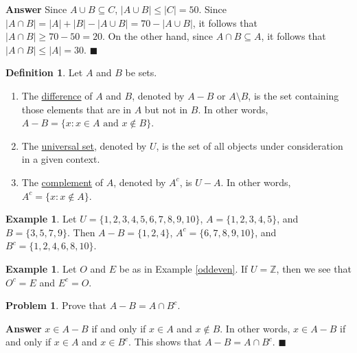 \documentclass[12pt,letterpaper]{book}
\numberwithin{equation}{section}
\theoremstyle{definition}
\newtheorem{defi}[thm]{\textbf{Definition}}
\newtheorem{problem}[thm]{\textbf{Problem}}
\newtheorem{example}[thm]{\textbf{Example}}
\newenvironment{answer}{\noindent\textbf{Answer}}{\hfill$\blacksquare$\vspace{0.1in}}
\begin{document}
\begin{answer}
Since $A\cup B\subseteq C$, $|A\cup B|\leq |C|=50$. Since $|A\cap B|=|A|+|B|-|A\cup B|=70-|A\cup B|$, it follows that $|A\cap B|\geq 70-50=20$. On the other hand, since $A\cap B \subseteq A$, it follows that $|A\cap B|\leq |A|=30$.
\end{answer}

\begin{defi} Let $A$ and $B$ be sets.
\begin{enumerate}
\item The \underline{difference} of $A$ and $B$, denoted by $A-B$ or $A\setminus B$, is the set containing those elements that are in $A$ but not in $B$. In other words, $A-B=\{x: x\in A \text{ and } x\notin B\}$.
\item The \underline{universal set}, denoted by $U$, is the set of all objects under consideration in a given context.
\item The \underline{complement} of $A$, denoted by $A^c$, is $U-A$. In other words, $A^c=\{x: x\notin A\}$.
\end{enumerate}
\end{defi}

\begin{example} Let $U=\{1,2,3,4,5,6,7,8,9,10\}$, $A=\{1,2,3,4,5\}$, and $B=\{3,5,7,9\}$. Then $A-B=\{1,2,4\}$, $A^c=\{6,7,8,9,10\}$, and $B^c=\{1,2,4,6,8,10\}$.
\end{example}

\begin{example} Let $O$ and $E$ be as in Example \ref{oddeven}. If $U=\mathbb{Z}$, then we see that $O^c=E$ and $E^c=O$.
\end{example}

\begin{problem} Prove that $A-B=A\cap B^c$.
\end{problem}

\begin{answer}
$x\in A-B$ if and only if $x\in A$ and $x\notin B$. In other words, $x\in A-B$ if and only if $x\in A$ and $x\in B^c$. This shows that $A-B=A\cap B^c$.
\end{answer}
\end{document}
